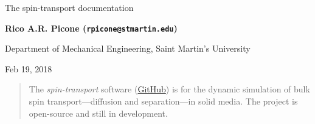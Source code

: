 \documentclass[%
oneside,                 %
final,                   %
10pt]{article}
\begin{document}

\newcommand{\exercisesection}[1]{\subsection*{#1}}







\thispagestyle{empty}

\begin{center}
{\LARGE\bf
\begin{spacing}{1.25}
The spin-transport documentation
\end{spacing}
}
\end{center}


\begin{center}
{\bf Rico A.R. Picone (\texttt{rpicone@stmartin.edu})}
\end{center}

    \begin{center}
\centerline{{\small Department of Mechanical Engineering, Saint Martin's University}}
\end{center}
    

\begin{center}
Feb 19, 2018
\end{center}

\vspace{1cm}

\begin{abstract}
The \emph{spin-transport} software (\href{{https://github.com/ricopicone/spin-transport}}{GitHub}) is for the dynamic simulation of bulk spin transport---diffusion and separation---in solid media.
The project is open-source and still in development.
\end{abstract}

\tableofcontents


\vspace{1cm} %
\end{document}

